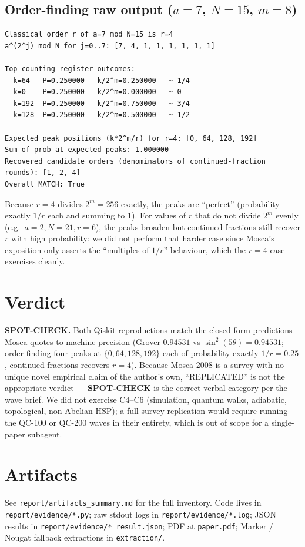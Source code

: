 \documentclass[11pt]{article}
\begin{document}
\subsection{Order-finding raw output ($a{=}7$, $N{=}15$, $m{=}8$)}
\begin{lstlisting}
Classical order r of a=7 mod N=15 is r=4
a^(2^j) mod N for j=0..7: [7, 4, 1, 1, 1, 1, 1, 1]

Top counting-register outcomes:
  k=64   P=0.250000   k/2^m=0.250000   ~ 1/4
  k=0    P=0.250000   k/2^m=0.000000   ~ 0
  k=192  P=0.250000   k/2^m=0.750000   ~ 3/4
  k=128  P=0.250000   k/2^m=0.500000   ~ 1/2

Expected peak positions (k*2^m/r) for r=4: [0, 64, 128, 192]
Sum of prob at expected peaks: 1.000000
Recovered candidate orders (denominators of continued-fraction rounds): [1, 2, 4]
Overall MATCH: True
\end{lstlisting}
Because $r{=}4$ divides $2^m{=}256$ exactly, the peaks are ``perfect'' (probability exactly $1/r$ each and summing to 1). For values of $r$ that do not divide $2^m$ evenly (e.g.\ $a{=}2,N{=}21,r{=}6$), the peaks broaden but continued fractions still recover $r$ with high probability; we did not perform that harder case since Mosca's exposition only asserts the ``multiples of $1/r$'' behaviour, which the $r{=}4$ case exercises cleanly.

\section{Verdict}
\textbf{SPOT-CHECK.} Both Qiskit reproductions match the closed-form predictions Mosca quotes to machine precision (Grover $0.94531$ vs $\sin^2(5\theta){=}0.94531$; order-finding four peaks at $\{0,64,128,192\}$ each of probability exactly $1/r{=}0.25$, continued fractions recovers $r{=}4$). Because Mosca 2008 is a survey with no unique novel empirical claim of the author's own, ``REPLICATED'' is not the appropriate verdict --- \textbf{SPOT-CHECK} is the correct verbal category per the wave brief. We did not exercise C4--C6 (simulation, quantum walks, adiabatic, topological, non-Abelian HSP); a full survey replication would require running the QC-100 or QC-200 waves in their entirety, which is out of scope for a single-paper subagent.

\section{Artifacts}
See \verb|report/artifacts_summary.md| for the full inventory. Code lives in \verb|report/evidence/*.py|; raw stdout logs in \verb|report/evidence/*.log|; JSON results in \verb|report/evidence/*_result.json|; PDF at \verb|paper.pdf|; Marker / Nougat fallback extractions in \verb|extraction/|.
\end{document}
